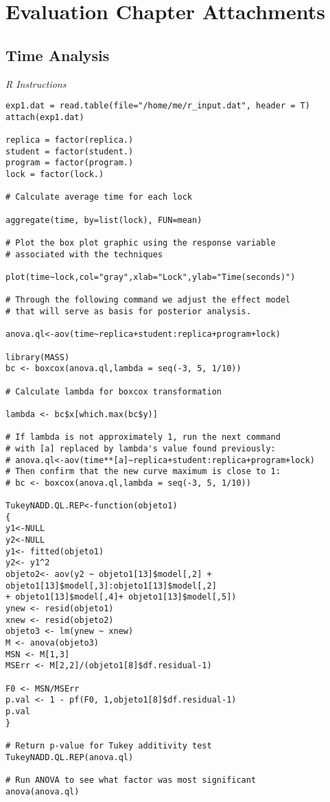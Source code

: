 \chapter{Evaluation Chapter Attachments}
\label{ap:evaluation-instructions}

\section{Time Analysis}

\medskip
\noindent
{\it R Instructions}
\begin{verbatim}
exp1.dat = read.table(file="/home/me/r_input.dat", header = T)
attach(exp1.dat)

replica = factor(replica.)
student = factor(student.)
program = factor(program.)
lock = factor(lock.)

# Calculate average time for each lock

aggregate(time, by=list(lock), FUN=mean)

# Plot the box plot graphic using the response variable
# associated with the techniques

plot(time~lock,col="gray",xlab="Lock",ylab="Time(seconds)")

# Through the following command we adjust the effect model
# that will serve as basis for posterior analysis.

anova.ql<-aov(time~replica+student:replica+program+lock)

library(MASS)
bc <- boxcox(anova.ql,lambda = seq(-3, 5, 1/10))

# Calculate lambda for boxcox transformation

lambda <- bc$x[which.max(bc$y)] 

# If lambda is not approximately 1, run the next command
# with [a] replaced by lambda's value found previously:
# anova.ql<-aov(time**[a]~replica+student:replica+program+lock)
# Then confirm that the new curve maximum is close to 1: 
# bc <- boxcox(anova.ql,lambda = seq(-3, 5, 1/10))

TukeyNADD.QL.REP<-function(objeto1)
{
y1<-NULL
y2<-NULL
y1<- fitted(objeto1)
y2<- y1^2
objeto2<- aov(y2 ~ objeto1[13]$model[,2] +
objeto1[13]$model[,3]:objeto1[13]$model[,2]
+ objeto1[13]$model[,4]+ objeto1[13]$model[,5])
ynew <- resid(objeto1)
xnew <- resid(objeto2)
objeto3 <- lm(ynew ~ xnew)
M <- anova(objeto3)
MSN <- M[1,3]
MSErr <- M[2,2]/(objeto1[8]$df.residual-1)

F0 <- MSN/MSErr
p.val <- 1 - pf(F0, 1,objeto1[8]$df.residual-1)
p.val
}

# Return p-value for Tukey additivity test
TukeyNADD.QL.REP(anova.ql)

# Run ANOVA to see what factor was most significant
anova(anova.ql)
\end{verbatim}

